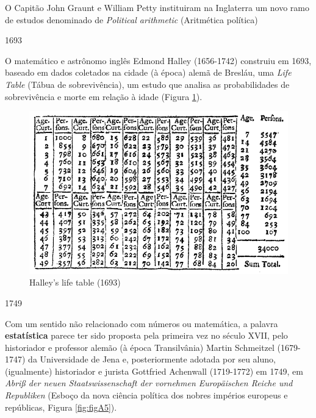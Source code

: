 \documentclass[
]{book}
\begin{document}
\hfill\break

O Capitão John Graunt e William Petty instituiram na Inglaterra um novo ramo de estudos denominado de \emph{Political arithmetic} (Aritmética política)

\hfill\break

1693

\hfill\break

O matemático e astrônomo inglês Edmond Halley (1656-1742) construiu em 1693, baseado em dados coletados na cidade (à época) alemã de Bresláu, uma \emph{Life Table} (Tábua de sobrevivência), um estudo que analisa as probabilidades de sobrevivência e morte em relação à idade (Figura \ref{fig:figA4}).

\hfill\break

\begin{figure}

{\centering \includegraphics[width=0.75\linewidth]{images1/halley} 

}

\caption{Halley’s life table (1693)}\label{fig:figA4}
\end{figure}

\hfill\break

1749

\hfill\break

Com um sentido não relacionado com números ou matemática, a palavra \textbf{estatística} parece ter sido proposta pela primeira vez no século XVII, pelo historiador e professor alemão (à época Transilvânia) Martin Schmeitzel (1679-1747) da Universidade de Jena e, posteriormente adotada por seu aluno, (igualmente) historiador e jurista Gottfried Achenwall (1719-1772) em 1749, em \emph{Abriß der neuen Staatswissenschaft der vornehmen Europäischen Reiche und Republiken} (Esboço da nova ciência política dos nobres impérios europeus e repúblicas, Figura \ref{fig:figA5}).

\hfill\break
\end{document}

